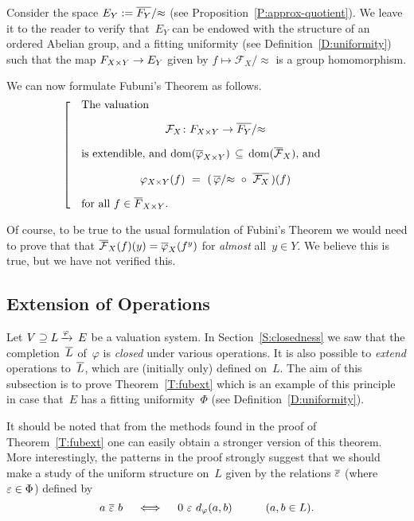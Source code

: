 \documentclass[main.tex]{subfiles}
\begin{document}
Consider the space $E_Y := \overline{F_Y}/{\approx}$
(see Proposition~\ref{P:approx-quotient}).
We leave it to the reader to
verify that~$E_Y$ can be endowed with 
the structure of an ordered Abelian group,
and a fitting uniformity
(see Definition~\ref{D:uniformity})
such that the map $F_{X\times Y} \rightarrow E_Y$
given by $f\mapsto \mathcal{F}_X /\approx$
is a group homomorphism.

We can now formulate Fubuni's Theorem as follows.
\begin{equation}
\label{eq:fub}
\left[\quad
\begin{minipage}{.7\columnwidth}
The valuation 
\begin{equation*}
\mathcal{F}_X\colon F_{X\times Y} \ra \qvL{\ol{F_Y}}
\end{equation*}
is extendible, 
and $\mathrm{dom}(\ol{\varphi}_{X\times Y})
\,\subseteq\, 
 \mathrm{dom}(\ol{\mathcal{F}}_X)$,
and 
\begin{equation*}
\varphi_{X\times Y}(f) \ =\ 
(\,\qvphi{\ol\varphi} \ \circ\  \ol{\mathcal{F}_X} \,)(f)
\end{equation*}
for all $f\in\ol{F}_{X\times Y}$.
\end{minipage}
\right.
\end{equation}

Of course,
to be true to the usual formulation of Fubini's Theorem
we would need to prove that
that $\overline{\mathcal{F}}_X(f)(y) = \overline{\varphi}_X(f^y)$
for \emph{almost} all~$y\in Y$.
We believe this is true,
but we have not verified this.

\subsection{Extension of Operations}
\label{SS:fub_part2}
Let $V \supseteq L\,\smash{\xrightarrow{\varphi}\,E}$ be a valuation system.
In Section~\ref{S:closedness}
we saw that the completion~$\overline{L}$ of~$\varphi$ is \emph{closed} under
various operations.
It is also possible to \emph{extend} operations
 to~$\overline{L}$, which are (initially only) defined on~$L$.
The aim of this subsection is to prove Theorem~\ref{T:fubext}
which is an example of this principle
in case that~$E$ has a fitting uniformity~$\Phi$
(see Definition~\ref{D:uniformity}).

It should be noted that from the methods
found in the proof of Theorem~\ref{T:fubext}
one can easily obtain a stronger version of this theorem.
More interestingly,
the patterns in the proof strongly suggest that
we should make a study of the uniform structure on~$L$
given by the relations $\overline{\varepsilon}$ (where $\varepsilon\in\Phi$) defined by
\begin{equation*}
a \ \ol{\ve}\ b \quad\iff\quad 0\ \ve\ \ld\varphi(a,b)\qquad\quad(a,b\in L).
\end{equation*}
\end{document}
